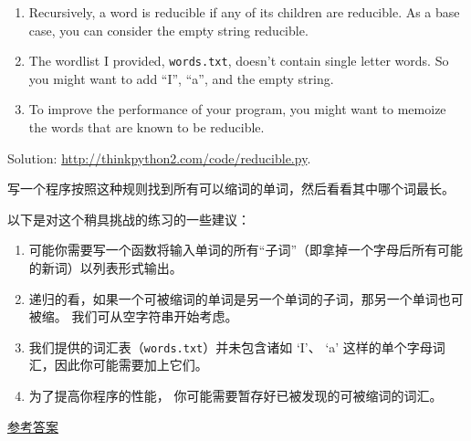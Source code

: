 \begin{exercise}
\begin{enumerate}
\item Recursively, a word is reducible if any of its children
are reducible.  As a base case, you can consider the empty
string reducible.

\item The wordlist I provided, {\tt words.txt}, doesn't
contain single letter words.  So you might want to add
``I'', ``a'', and the empty string.

\item To improve the performance of your program, you might want
to memoize the words that are known to be reducible.

\end{enumerate}

Solution: \url{http://thinkpython2.com/code/reducible.py}.

写一个程序按照这种规则找到所有可以缩词的单词，然后看看其中哪个词最长。

以下是对这个稍具挑战的练习的一些建议：

\begin{enumerate}
\item 可能你需要写一个函数将输入单词的所有``子词''（即拿掉一个字母后所有可能的新词）以列表形式输出。
 

\item 递归的看，如果一个可被缩词的单词是另一个单词的子词，那另一个单词也可被缩。 我们可从空字符串开始考虑。

\item 我们提供的词汇表（\lstinline{words.txt}）并未包含诸如 `I'、 `a' 这样的单个字母词汇，因此你可能需要加上它们。

\item 为了提高你程序的性能， 你可能需要暂存好已被发现的可被缩词的词汇。

\end{enumerate}

\href{http://thinkpython2.com/code/reducible.py}{参考答案}

\end{exercise}







